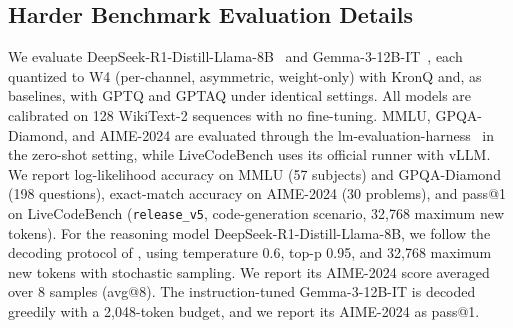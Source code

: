 \documentclass{article} %
\begin{document}
\subsection{Harder Benchmark Evaluation Details}
\label{app:harder}
We evaluate DeepSeek-R1-Distill-Llama-8B~\citep{guo2025deepseek} and Gemma-3-12B-IT~\citep{gemma3}, each quantized to W4 (per-channel, asymmetric, weight-only) with KronQ and, as baselines, with GPTQ and GPTAQ under identical settings. All models are calibrated on 128 WikiText-2 sequences with no fine-tuning. MMLU, GPQA-Diamond, and AIME-2024 are evaluated through the lm-evaluation-harness~\citep{eval-harness} in the zero-shot setting, while LiveCodeBench uses its official runner with vLLM. We report log-likelihood accuracy on MMLU (57 subjects) and GPQA-Diamond (198 questions), exact-match accuracy on AIME-2024 (30 problems), and pass@1 on LiveCodeBench (\texttt{release\_v5}, code-generation scenario, 32{,}768 maximum new tokens). For the reasoning model DeepSeek-R1-Distill-Llama-8B, we follow the decoding protocol of \citet{liu2025quantization}, using temperature 0.6, top-p 0.95, and 32{,}768 maximum new tokens with stochastic sampling. We report its AIME-2024 score averaged over 8 samples (avg@8). The instruction-tuned Gemma-3-12B-IT is decoded greedily with a 2{,}048-token budget, and we report its AIME-2024 as pass@1.
\end{document}
